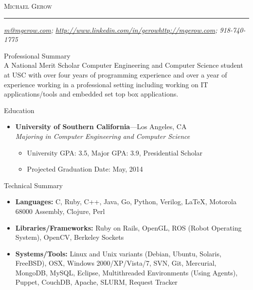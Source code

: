 \documentclass[8pt,oneside]{article}
\makeatletter
\newcommand{\name}{Michael Gerow}
\newcommand{\phone}{918-740-1775}
\newcommand{\email}{\href{mailto:m@mgerow.com?subject=Hello}{m@mgerow.com}}
\newcommand{\linkedin}{\href{http://www.linkedin.com/in/gerow}{http://www.linkedin.com/in/gerow}}
\newcommand{\website}{\href{http://mgerow.com}{http://mgerow.com}}
\newcommand{\bigname}[1]{
	\begin{center}\fontfamily{phv}\selectfont\Large\scshape#1\end{center}
}
\newenvironment{ressection}[1]{
	\vspace{4pt}
	{\fontfamily{phv}\selectfont\large#1}
	\begin{itemize}
	\vspace{3pt}
}{
	\end{itemize}
}
\newcommand{\resplainsection}[1]{
	{\fontfamily{phv}\selectfont\large#1}
	\vspace{-12pt}
	\\

}
\newcommand{\resitem}[1]{
	\vspace{-4pt}
	\item \begin{flushleft} #1 \end{flushleft}
}
\newcommand{\ressubitem}[1]{
	\vspace{-1pt}
	\item \begin{flushleft} #1 \end{flushleft}
}
\newcommand{\resbigitem}[3]{
	\vspace{-5pt}
	\item
	\textbf{#1}---#2 \\
	\textit{#3}
}
\newenvironment{ressubsec}[3]{
	\resbigitem{#1}{#2}{#3}
	\vspace{-2pt}
	\begin{itemize}
}{
	\end{itemize}
}
\makeatother
\begin{document}
 \selectfont

\bigname{\name}

\vspace{-8pt} \rule{\textwidth}{1pt}

\vspace{-1pt} {\small\itshape \email; \linkedin \hfill \website; \phone}

\vspace{8 pt}


\resplainsection{Professional Summary}
	A National Merit Scholar Computer Engineering and Computer Science student at USC with over four years of programming experience and over a year of experience working in a professional setting including working on IT applications/tools and embedded set top box applications.

\begin{ressection}{Education}

	\begin{ressubsec}{University of Southern California}{Los Angeles, CA}{Majoring in Computer Engineering and Computer Science}
		\ressubitem{University GPA:  3.5, Major GPA: 3.9, Presidential Scholar}
		\ressubitem{Projected Graduation Date:  May, 2014}
	\end{ressubsec}

\end{ressection}

\begin{ressection}{Technical Summary}

	\resitem{\textbf{Languages:} C, Ruby, C++, Java, Go, Python, Verilog, \LaTeX, Motorola 68000 Assembly, Clojure, Perl}
	\resitem{\textbf{Libraries/Frameworks:} Ruby on Rails, OpenGL, ROS (Robot Operating System), OpenCV, Berkeley Sockets }
	\resitem{\textbf{Systems/Tools:} Linux and Unix variants (Debian, Ubuntu, Solaris, FreeBSD), OSX, Windows 2000/XP/Vista/7, SVN, Git, Mercurial, MongoDB, MySQL, Eclipse, Multithreaded Environments (Using Agents), Puppet, CouchDB, Apache, SLURM, Request Tracker}
	
\end{ressection}


\end{document}
